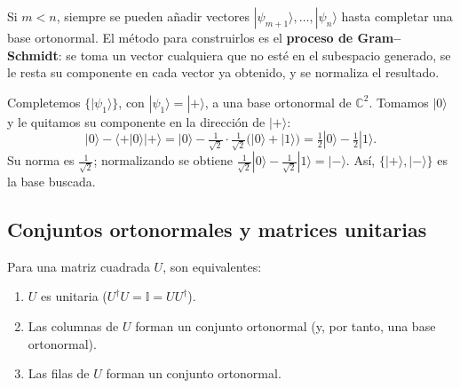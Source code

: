 \documentclass[11pt, a4paper, twoside, openright]{report}
\begin{document}
\noindent Si $m<n$, siempre se pueden añadir vectores $|\psi_{m+1}\rangle,\dots,|\psi_n\rangle$ hasta completar una base ortonormal. El método para construirlos es el \textbf{proceso de Gram--Schmidt}: se toma un vector cualquiera que no esté en el subespacio generado, se le resta su componente en cada vector ya obtenido, y se normaliza el resultado.

\begin{tcolorbox}[colback=cyan!5!white,colframe=cyan!75!black,title=\textbf{Ejemplo: Completar una base con Gram--Schmidt}]
Completemos $\{|\psi_1\rangle\}$, con $|\psi_1\rangle = |+\rangle$, a una base ortonormal de $\mathbb{C}^2$. Tomamos $|0\rangle$ y le quitamos su componente en la dirección de $|+\rangle$:
\[ |0\rangle - \langle+|0\rangle|+\rangle = |0\rangle - \tfrac{1}{\sqrt2}\cdot\tfrac{1}{\sqrt2}\big(|0\rangle + |1\rangle\big) = \tfrac12|0\rangle - \tfrac12|1\rangle. \]
Su norma es $\frac{1}{\sqrt2}$; normalizando se obtiene $\frac{1}{\sqrt2}|0\rangle - \frac{1}{\sqrt2}|1\rangle = |-\rangle$. Así, $\{|+\rangle,|-\rangle\}$ es la base buscada.
\end{tcolorbox}

\subsection{Conjuntos ortonormales y matrices unitarias}

\begin{tcolorbox}[colback=teal!5!white,colframe=teal!75!black,title=\textbf{Proposición: Unitarias y bases ortonormales}]
Para una matriz cuadrada $U$, son equivalentes:
\begin{enumerate}
    \item $U$ es unitaria ($U^\dagger U = \mathbb{I} = UU^\dagger$).
    \item Las columnas de $U$ forman un conjunto ortonormal (y, por tanto, una base ortonormal).
    \item Las filas de $U$ forman un conjunto ortonormal.
\end{enumerate}
\end{tcolorbox}
\end{document}
